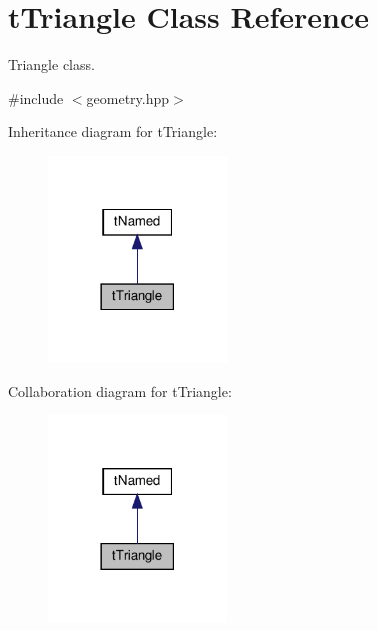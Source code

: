 \hypertarget{classtTriangle}{}\section{t\+Triangle Class Reference}
\label{classtTriangle}


Triangle class.  




{\ttfamily \#include $<$geometry.\+hpp$>$}



Inheritance diagram for t\+Triangle\+:
\nopagebreak
\begin{figure}[H]
\begin{center}
\leavevmode
\includegraphics[width=134pt]{classtTriangle__inherit__graph}
\end{center}
\end{figure}


Collaboration diagram for t\+Triangle\+:
\nopagebreak
\begin{figure}[H]
\begin{center}
\leavevmode
\includegraphics[width=134pt]{classtTriangle__coll__graph}
\end{center}
\end{figure}
